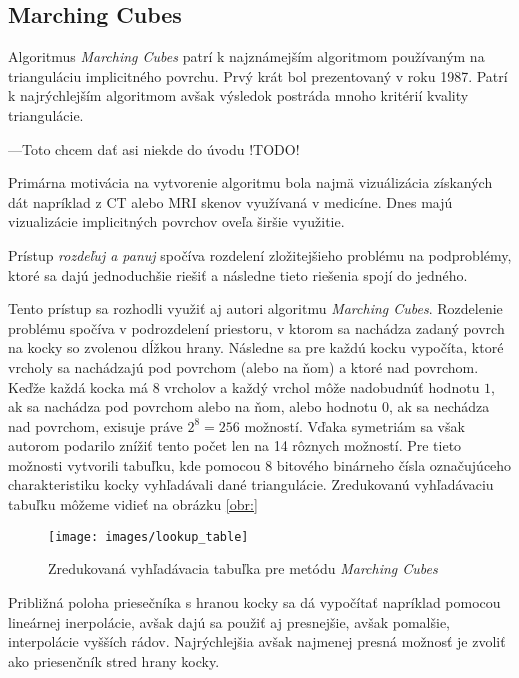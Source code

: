 \subsection{Marching Cubes}

Algoritmus \textit{Marching Cubes} \cite{lorensen1987marching} patrí k najznámejším algoritmom používaným
na trianguláciu implicitného povrchu. Prvý krát bol prezentovaný v roku 1987. Patrí k najrýchlejším
algoritmom avšak výsledok postráda mnoho kritérií kvality triangulácie. 

---Toto chcem dať asi niekde do úvodu !TODO!


Primárna motivácia na vytvorenie algoritmu bola najmä vizuálizácia získaných dát napríklad z CT alebo MRI skenov 
využívaná v medicíne. Dnes majú vizualizácie implicitných povrchov oveľa širšie využitie.

Prístup \textit{rozdeľuj a panuj} spočíva rozdelení zložitejšieho problému na podproblémy, 
ktoré sa dajú jednoduchšie riešiť a následne tieto riešenia spojí do jedného.

Tento prístup sa rozhodli využiť aj autori algoritmu \textit{Marching Cubes}. Rozdelenie problému
spočíva v podrozdelení priestoru, v ktorom sa nachádza zadaný povrch na kocky so zvolenou dĺžkou
hrany. Následne sa pre každú kocku vypočíta, ktoré vrcholy sa nachádzajú pod povrchom (alebo na ňom) 
a ktoré nad povrchom. Keďže každá kocka má 8 vrcholov a každý vrchol môže nadobudnúť hodnotu $1$, ak sa 
nachádza pod povrchom alebo na ňom, alebo hodnotu $0$, ak sa nechádza nad povrchom, exisuje práve 
$2^8 = 256$ možností. Vďaka symetriám sa však autorom podarilo znížiť tento počet len na 14 rôznych možností.
Pre tieto možnosti vytvorili tabuľku, kde pomocou 8 bitového binárneho čísla označujúceho charakteristiku
kocky vyhľadávali dané triangulácie. Zredukovanú vyhľadávaciu tabuľku môžeme vidieť na obrázku \ref{obr:}

\begin{figure}
    \centerline{\texttt{[image: images/lookup\_table]}}
    \caption[Zredukovaná vyhľadávacia tabuľka \cite{smistad2012real} pre metódu \textit{Marching Cubes}]{Zredukovaná vyhľadávacia tabuľka \cite{smistad2012real} pre metódu \textit{Marching Cubes}}
    \label{obr:lookup_table}
\end{figure}

Približná poloha priesečníka s hranou kocky sa dá vypočítať napríklad pomocou lineárnej inerpolácie, avšak 
dajú sa použiť aj presnejšie, avšak pomalšie, interpolácie vyšších rádov. Najrýchlejšia avšak najmenej presná
možnosť je zvoliť ako priesenčník stred hrany kocky.

